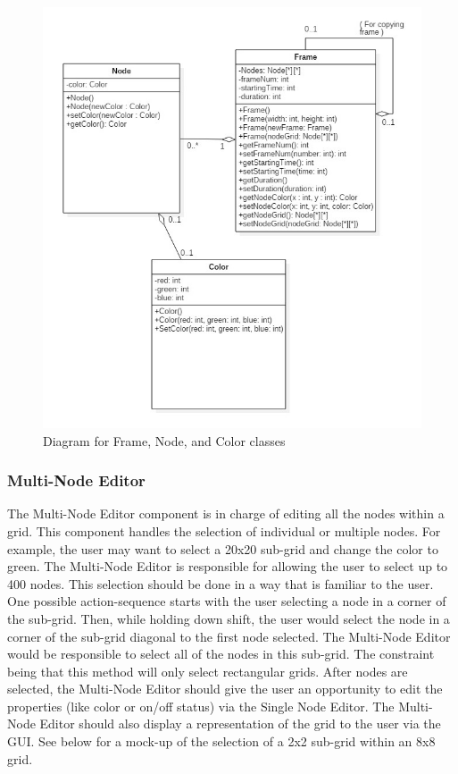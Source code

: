 \documentclass[12pt]{article}
\begin{document}
	\begin{figure}[ht!]
    \centering
    \includegraphics[width=0.9\linewidth]{node_frame_prototype}
    \caption{Diagram for Frame, Node, and Color classes}
  \end{figure}
	
	\subsubsection {Multi-Node Editor}
  	The Multi-Node Editor component is in charge of editing all the nodes within a grid. This component handles the selection of individual or multiple nodes. For example, the user may want to select a 20x20 sub-grid and change the color to green. The Multi-Node Editor is responsible for allowing the user to select up to 400 nodes. 
    This selection should be done in a way that is familiar to the user. One possible action-sequence starts with the user selecting a node in a corner of the sub-grid. Then, while holding down shift, the user would select the node in a corner of the sub-grid diagonal to the first node selected. The Multi-Node Editor would be responsible to select all of the nodes in this sub-grid. The constraint being that this method will only select rectangular grids.	
  	After nodes are selected, the Multi-Node Editor should give the user an opportunity to edit the properties (like color or on/off status) via the Single Node Editor.   	
  	The Multi-Node Editor should also display a representation of the grid to the user via the GUI. See below for a mock-up of the selection of a 2x2 sub-grid within an 8x8 grid.
	
\end{document}
